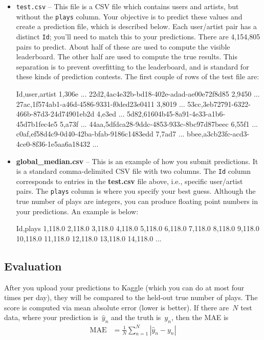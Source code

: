 \documentclass[12pt]{article}
\begin{document}
\begin{itemize}
\item \verb|test.csv| -- This file is a CSV file which contains users and artists, but without the \texttt{plays} column.  Your objective is to predict these values and create a prediction file, which is described below.  Each user/artist pair has a distinct \texttt{Id}; you'll need to match this to your predictions.  There are 4,154,805 pairs to predict.  About half of these are used to compute the visible leaderboard.  The other half are used to compute the true results.  This separation is to prevent overfitting to the leaderboard, and is standard for these kinds of prediction contests.  The first couple of rows of the test file are:
\begin{csv}
Id,user,artist
1,306e ... 22d2,4ac4e32b-bd18-402e-adad-ae00e72f8d85
2,9450 ... 27ac,1f574ab1-a46d-4586-9331-f0ded23e0411
3,8019 ... 53cc,3eb72791-6322-466b-87d3-24d74901eb2d
4,e3ed ... 5d82,61604b45-8a91-4e33-a1b6-45d7b1fec4e5
5,a73f ... 44aa,5dfdca28-9ddc-4853-933c-8bc97d87beec
6,55f1 ... c0af,ef58d4c9-0d40-42ba-bfab-9186c1483edd
7,7ad7 ... bbee,a3cb23fc-acd3-4ce0-8f36-1e5aa6a18432
...
\end{csv}

\item \textbf{global\_median.csv} -- This is an example of how you submit predictions.  It is a standard comma-delimited CSV file with two columns.  The \texttt{Id} column corresponds to entries in the \textbf{test.csv} file above, i.e., specific user/artist pairs.  The \texttt{plays} column is where you specify your best guess.  Although the true number of plays are integers, you can produce floating point numbers in your predictions.  An example is below:
\begin{csv}
Id,plays
1,118.0
2,118.0
3,118.0
4,118.0
5,118.0
6,118.0
7,118.0
8,118.0
9,118.0
10,118.0
11,118.0
12,118.0
13,118.0
14,118.0
...
\end{csv}

\end{itemize}

\subsection*{Evaluation}
After you upload your predictions to Kaggle (which you can do at most four times per day), they will be compared to the held-out true number of plays.  The score is computed via mean absolute error (lower is better).  If there are~$N$ test data, where your prediction is~$\hat{y}_n$ and the truth is~$y_n$, then the MAE is 
\begin{align*}
\text{MAE} &= \frac{1}{N}\sum_{n=1}^N|\hat{y}_n-y_n|
\end{align*}
\end{document}
